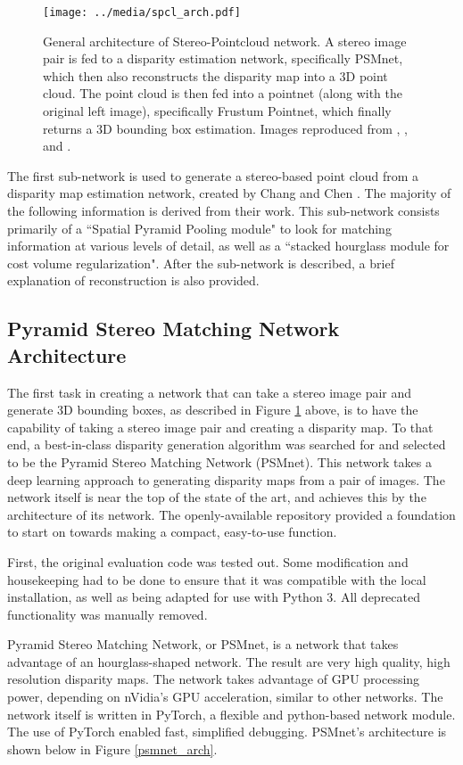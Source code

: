 \begin{figure}[ht]
	\centering
	\texttt{[image: ../media/spcl\_arch.pdf]}
	\caption{General architecture of Stereo-Pointcloud network. A stereo image pair is fed to a disparity estimation network, specifically PSMnet, which then also reconstructs the disparity map into a 3D point cloud. The point cloud is then fed into a pointnet (along with the original left image), specifically Frustum Pointnet, which finally returns a 3D bounding box estimation. Images reproduced from \cite{geiger_are_2012}, \cite{chang_pyramid_2018}, and \cite{qi_frustum_2017}.}
	\label{spcl_arch}
\end{figure}

The first sub-network is used to generate a stereo-based point cloud from a disparity map estimation network, created by Chang and Chen \cite{chang_pyramid_2018}. The majority of the following information is derived from their work. This sub-network consists primarily of a ``Spatial Pyramid Pooling module" to look for matching information at various levels of detail, as well as a ``stacked hourglass module for cost volume regularization". After the sub-network is described, a brief explanation of reconstruction is also provided. 

\subsection{Pyramid Stereo Matching Network Architecture}
The first task in creating a network that can take a stereo image pair and generate 3D bounding boxes, as described in Figure \ref{spcl_arch} above, is to have the capability of taking a stereo image pair and creating a disparity map. To that end, a best-in-class disparity generation algorithm was searched for and selected to be the Pyramid Stereo Matching Network (PSMnet). This network takes a deep learning approach to generating disparity maps from a pair of images. The network itself is near the top of the state of the art, and achieves this by the architecture of its network. The openly-available repository provided a foundation to start on towards making a compact, easy-to-use function.

First, the original evaluation code was tested out. Some modification and housekeeping had to be done to ensure that it was compatible with the local installation, as well as being adapted for use with Python 3. All deprecated functionality was manually removed.

Pyramid Stereo Matching Network, or PSMnet, is a network that takes advantage of an hourglass-shaped network. The result are very high quality, high resolution disparity maps. The network takes advantage of GPU processing power, depending on nVidia's GPU acceleration, similar to other networks. The network itself is written in PyTorch, a flexible and python-based network module. The use of PyTorch enabled fast, simplified debugging. PSMnet's architecture is shown below in Figure \ref{psmnet_arch}.


